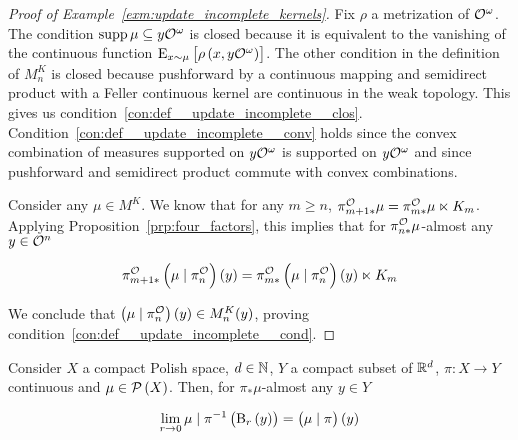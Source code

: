 \begin{proof}[Proof of Example~\ref{exm:update_incomplete_kernels}]
Fix $\rho$ a metrization of $\mathcal{O}^\omega$. The condition $\operatorname{supp}{\mu} \subseteq y\mathcal{O}^\omega$ is closed because it is equivalent to the vanishing of the continuous function $\operatorname{E}_{x\sim\mu}\left[\rho\left(x,y\mathcal{O}^\omega\right)\right]$. The other condition in the definition of $M^K_n$ is closed because pushforward by a continuous mapping and semidirect product with a Feller continuous kernel are continuous in the weak topology. This gives us condition~\ref{con:def__update_incomplete__clos}. Condition~\ref{con:def__update_incomplete__conv} holds since the convex combination of measures supported on $y\mathcal{O}^\omega$ is supported on $y\mathcal{O}^\omega$ and since pushforward and semidirect product commute with convex combinations.

Consider any $\mu \in M^K$. We know that for any $m \geq n$, $\pi^{\mathcal{O}}_{m+1*}\mu=\pi^{\mathcal{O}}_{m*}\mu \ltimes K_m$. Applying Proposition~\ref{prp:four_factors}, this implies that for $\pi^{\mathcal{O}}_{n*}\mu$-almost any $y\in\mathcal{O}^n$

\[\pi^{\mathcal{O}}_{m+1*}\left(\mu \mid \pi^{\mathcal{O}}_n\right)(y)=\pi^{\mathcal{O}}_{m*}\left(\mu \mid \pi^{\mathcal{O}}_n\right)(y) \ltimes K_m\]

We conclude that $\left(\mu \mid \pi^{\mathcal{O}}_n\right)(y) \in M^K_n(y)$, proving condition~\ref{con:def__update_incomplete__cond}.
\end{proof}

\begin{samepage}
\begin{proposition}
\label{prp:differentiation}

Consider $X$ a compact Polish space, $d \in \mathbb{N}$, $Y$ a compact subset of $\mathbb{R}^d$, $\pi: X \rightarrow Y$ continuous and $\mu \in \mathcal{P}\left(X\right)$. Then, for $\pi_*\mu$-almost any $y \in Y$

\begin{equation}
\lim_{r \rightarrow 0}{\mu \mid \pi^{-1}\left(\operatorname{B}_r\left(y\right)\right) = \left(\mu \mid \pi\right)\left(y\right)}
\end{equation}

\end{proposition}
\end{samepage}

